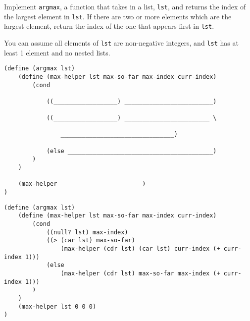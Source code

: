 \question
Implement \lstinline{argmax}, a function that takes in a list, \lstinline{lst}, and returns the index of the largest element in \lstinline{lst}. If there are two or more elements which are the largest element, return the index of the one that appears first in \lstinline{lst}.

You can assume all elements of \lstinline{lst} are non-negative integers, and \lstinline{lst} has at least 1 element and no nested lists.

\begin{lstlisting}
(define (argmax lst)
    (define (max-helper lst max-so-far max-index curr-index)
        (cond

            ((__________________) _________________________)

            ((__________________) ________________________ \

                ________________________________)

            (else _________________________________________)
        )
    )

    (max-helper _______________________)
)
\end{lstlisting}

\begin{solution}
\begin{lstlisting}
(define (argmax lst)
    (define (max-helper lst max-so-far max-index curr-index)
        (cond
            ((null? lst) max-index)
            ((> (car lst) max-so-far) 
                (max-helper (cdr lst) (car lst) curr-index (+ curr-index 1)))
            (else
                (max-helper (cdr lst) max-so-far max-index (+ curr-index 1)))
        )
    )
    (max-helper lst 0 0 0)
)
\end{lstlisting}
\end{solution}